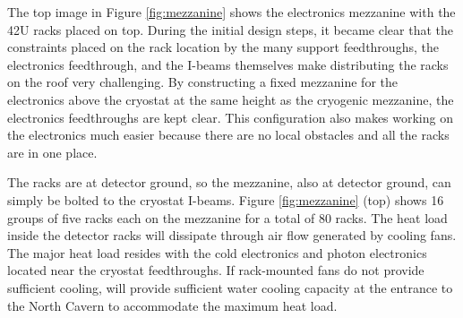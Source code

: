 The top image in Figure \ref{fig:mezzanine} shows the  electronics mezzanine with the 42U racks placed on top. 
During the initial design steps, it became clear that the constraints placed on the rack location by the many  support feedthroughs, the electronics feedthrough, and the I-beams themselves make distributing the racks on the roof very challenging. 
By constructing a fixed mezzanine for the electronics 
above the cryostat at the same height as the cryogenic mezzanine, the electronics feedthroughs are kept clear. 
This configuration also makes working on the electronics much easier because there are no local obstacles and all the racks are in one place.

The racks are %
at detector ground, so the mezzanine, %
also at detector 
ground, %
can simply be bolted to the cryostat I-beams. 
Figure \ref{fig:mezzanine} (top) shows 16 groups of five racks each %
on the mezzanine for a total of 80 racks. 
The heat load inside the detector racks will %
dissipate through air flow generated by cooling fans.  The major heat load resides with the cold electronics and photon electronics located near the cryostat feedthroughs.  If rack-mounted fans do not provide sufficient cooling,   will provide sufficient water cooling capacity at the entrance to the North Cavern to accommodate the maximum heat load. 


